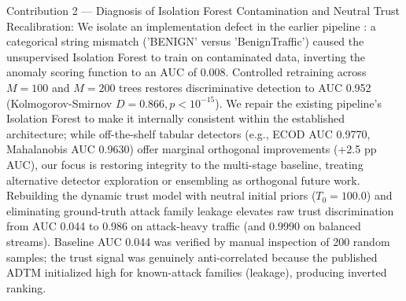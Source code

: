 \documentclass[journal,10pt,onecolumn]{IEEEtran}
\begin{document}
Contribution 2 — Diagnosis of Isolation Forest Contamination and Neutral Trust Recalibration:
We isolate an implementation defect in the earlier pipeline \cite{1}: a categorical string mismatch ('BENIGN' versus 'BenignTraffic') caused the unsupervised Isolation Forest to train on contaminated data, inverting the anomaly scoring function to an AUC of 0.008. Controlled retraining across $M=100$ and $M=200$ trees restores discriminative detection to AUC 0.952 (Kolmogorov-Smirnov $D = 0.866, p < 10^{-15}$). We repair the existing pipeline's Isolation Forest to make it internally consistent within the established architecture; while off-the-shelf tabular detectors (e.g., ECOD AUC 0.9770, Mahalanobis AUC 0.9630) offer marginal orthogonal improvements (+2.5 pp AUC), our focus is restoring integrity to the multi-stage baseline, treating alternative detector exploration or ensembling as orthogonal future work. Rebuilding the dynamic trust model with neutral initial priors ($T_0 = 100.0$) and eliminating ground-truth attack family leakage elevates raw trust discrimination from AUC 0.044 to 0.986 on attack-heavy traffic (and 0.9990 on balanced streams). Baseline AUC 0.044 was verified by manual inspection of 200 random samples; the trust signal was genuinely anti-correlated because the published ADTM initialized high for known-attack families (leakage), producing inverted ranking.
\end{document}
